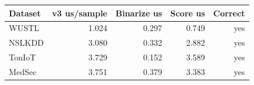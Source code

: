 \begin{tabular}{lrrrr}
\toprule
Dataset & v3 us/sample & Binarize us & Score us & Correct \\
\midrule
WUSTL & 1.024 & 0.297 & 0.749 & yes \\
NSLKDD & 3.080 & 0.332 & 2.882 & yes \\
TonIoT & 3.729 & 0.152 & 3.589 & yes \\
MedSec & 3.751 & 0.379 & 3.383 & yes \\
\bottomrule
\end{tabular}
